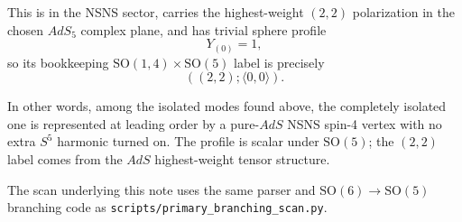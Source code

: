 \documentclass[12pt]{article}
\newcommand{\SO}{\mathrm{SO}}
\newcommand{\la}{\langle}
\newcommand{\ra}{\rangle}
\begin{document}
This is in the NSNS sector, carries the highest-weight $(2,2)$ polarization in the chosen
$AdS_5$ complex plane, and has trivial sphere profile
\begin{equation}
Y_{(0)}=1,
\end{equation}
so its bookkeeping $\SO(1,4)\times \SO(5)$ label is precisely
\begin{equation}
((2,2);\la 0,0\ra).
\end{equation}

In other words, among the isolated modes found above, the completely isolated one is represented
at leading order by a pure-$AdS$ NSNS spin-4 vertex with no extra $S^5$ harmonic turned on.
The profile is scalar under $\SO(5)$; the $(2,2)$ label comes from the $AdS$ highest-weight tensor
structure.

The scan underlying this note uses the same parser and $\SO(6)\to \SO(5)$ branching code as
\texttt{scripts/primary\_branching\_scan.py}.
\end{document}
